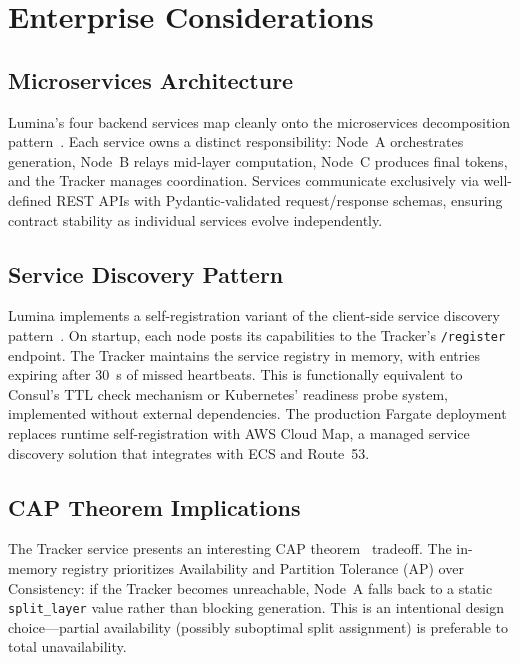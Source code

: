 \documentclass[conference]{IEEEtran}
\begin{document}
\section{Enterprise Considerations}

\subsection{Microservices Architecture}

Lumina's four backend services map cleanly onto the microservices decomposition
pattern~\cite{newman2021microservices}. Each service owns a distinct
responsibility: Node~A orchestrates generation, Node~B relays mid-layer
computation, Node~C produces final tokens, and the Tracker manages
coordination. Services communicate exclusively via well-defined REST APIs with
Pydantic-validated request/response schemas, ensuring contract stability as
individual services evolve independently.

\subsection{Service Discovery Pattern}

Lumina implements a self-registration variant of the client-side service
discovery pattern~\cite{richardson2018patterns}. On startup, each node posts
its capabilities to the Tracker's \texttt{/register} endpoint. The Tracker
maintains the service registry in memory, with entries expiring after 30~s of
missed heartbeats. This is functionally equivalent to Consul's TTL check
mechanism or Kubernetes' readiness probe system, implemented without external
dependencies. The production Fargate deployment replaces runtime
self-registration with AWS Cloud Map, a managed service discovery solution
that integrates with ECS and Route~53.

\subsection{CAP Theorem Implications}

The Tracker service presents an interesting CAP theorem~\cite{brewer2012cap}
tradeoff. The in-memory registry prioritizes Availability and Partition
Tolerance (AP) over Consistency: if the Tracker becomes unreachable, Node~A
falls back to a static \texttt{split\_layer} value rather than blocking
generation. This is an intentional design choice---partial availability
(possibly suboptimal split assignment) is preferable to total unavailability.
\end{document}
